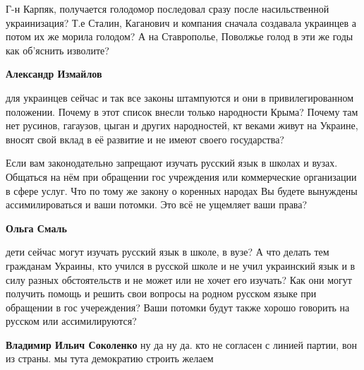 \begin{itemize}
\begin{itemize}
Г-н Карпяк, получается голодомор последовал сразу после насильственной
украинизация? Т.е Сталин, Каганович и компания сначала создавала украинцев а
потом их же морила голодом? А на Ставрополье, Поволжье голод в эти же годы как
об'яснить изволите?

 

\textbf{Александр Измайлов} 

для украинцев сейчас и так все законы штампуются и они в привилегированном
положении. Почему в этот список внесли только народности Крыма? Почему там нет
русинов, гагаузов, цыган и других народностей, кт веками живут на Украине,
вносят свой вклад в её развитие и не имеют своего государства?

Если вам законодательно запрещают изучать русский язык в школах и вузах.
Общаться на нём при обращении гос учреждения или коммерческие организации в
сфере услуг. Что по тому же закону о коренных народах Вы будете вынуждены
ассимилироваться и ваши потомки. Это всё не ущемляет ваши права?


 
\textbf{Ольга Смаль} 

дети сейчас могут изучать русский язык в школе, в вузе? А что делать тем
гражданам Украины, кто учился в русской школе и не учил украинский язык и в
силу разных обстоятельств и не может или не хочет его изучать? Как они могут
получить помощь и решить свои вопросы на родном русском языке при обращении в
гос учереждения? Ваши потомки будут также хорошо говорить на русском или
ассимилируются?

 
\textbf{Владимир Ильич Соколенко} ну да ну да. кто не согласен с линией партии, вон из страны. мы тута демократию строить желаем

 

\end{itemize}
\end{itemize}
